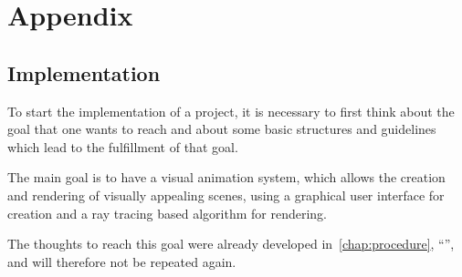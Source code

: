 \documentclass[
    a4paper,      %
    10pt,         %
    openright,    %
    notitlepage,  %
    parskip=half, %
]{scrreprt}       %
\theoremstyle{definition}                    %
\begin{document}
\cleardoublepage{}
\glsaddall{}
\printglossaries{}

\cleardoublepage{}
\printbibliography{}

{}
\listoffigures
{}
\listoftables
{}
\lstlistoflistings{}



\chapter{Appendix}
\label{chap:appendix}


\section{Implementation}
\label{sec:appendix-implementation}

To start the implementation of a project, it is necessary to first think about the
goal that one wants to reach and about some basic structures and guidelines
which lead to the fulfillment of that goal.

The main goal is to have a visual animation system, which allows the creation
and rendering of visually appealing scenes, using a graphical user interface for
creation and a ray tracing based algorithm for rendering.

The thoughts to reach this goal were already developed
in~\autoref{chap:procedure}, \enquote{}, and will
therefore not be repeated again.
\end{document}
